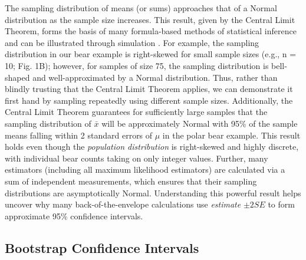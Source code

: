 \documentclass[fleqn,10pt]{wlpeerj} %
\begin{document}
The sampling distribution of means (or sums) approaches that of a Normal distribution as the sample size increases. This result, given by the Central Limit Theorem, forms the basis of many formula-based methods of statistical inference and can be illustrated through simulation \citep{kwak2017central}. For example, the sampling distribution in our bear example is right-skewed for small sample sizes (e.g., n = 10; Fig. 1B); however, for samples of size 75, the sampling distribution is bell-shaped and well-approximated by a Normal distribution. Thus, rather than blindly trusting that the Central Limit Theorem applies, we can demonstrate it first hand by sampling repeatedly using different sample sizes. Additionally, the Central Limit Theorem guarantees for sufficiently large samples that the sampling distribution of \(\bar{x}\) will be approximately Normal with 95\% of the sample means falling within 2 standard errors of \(\mu\) in the polar bear example. This result holds even though the \emph{population distribution} is right-skewed and highly discrete, with individual bear counts taking on only integer values. Further, many estimators (including all maximum likelihood estimators) are calculated via a sum of independent measurements, which ensures that their sampling distributions are asymptotically Normal. Understanding this powerful result helps uncover why many back-of-the-envelope calculations use \emph{estimate} \(\pm 2SE\) to form approximate 95\% confidence intervals.

\hypertarget{bootstrap-confidence-intervals}{%
\subsection*{Bootstrap Confidence Intervals}\label{bootstrap-confidence-intervals}}
\end{document}
